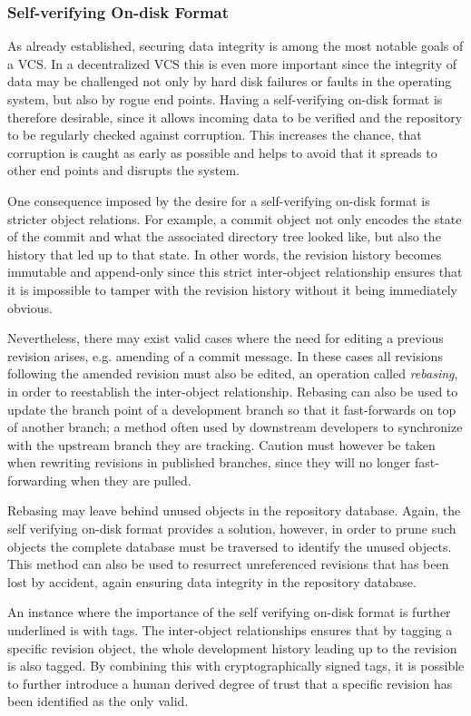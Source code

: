 \subsubsection{Self-verifying On-disk Format}

As already established, securing data integrity is among the most
notable goals of a VCS. In a decentralized VCS this is even more
important since the integrity of data may be challenged not only by
hard disk failures or faults in the operating system, but also by
rogue end points. Having a self-verifying on-disk
format is therefore desirable, since it allows incoming data to be
verified and the repository to be regularly checked against
corruption. This increases the chance, that corruption is caught as
early as possible and helps to avoid that it spreads to other end
points and disrupts the system.

One consequence imposed by the desire for a self-verifying on-disk
format is stricter object relations. For example, a commit object not
only encodes the state of the commit and what the associated directory
tree looked like, but also the history that led up to that state. In
other words, the revision history becomes immutable and append-only
since this strict inter-object relationship ensures that it is
impossible to tamper with the revision history without it being
immediately obvious.

Nevertheless, there may exist valid cases where the need for editing a
previous revision arises, e.g. amending of a commit message. In these
cases all revisions following the amended revision must also be
edited, an operation called \emph{rebasing}, in order to reestablish
the inter-object relationship. Rebasing can also be used to update the
branch point of a development branch so that it fast-forwards on top
of another branch; a method often used by downstream developers to
synchronize with the upstream branch they are tracking. Caution must
however be taken when rewriting revisions in published branches, since
they will no longer fast-forwarding when they are pulled.

Rebasing may leave behind unused objects in the repository database.
Again, the self verifying on-disk format provides a solution,
however, in order to prune such objects the complete database must be
traversed to identify the unused objects. This method can also be used
to resurrect unreferenced revisions that has been lost by accident,
again ensuring data integrity in the repository database.

An instance where the importance of the self verifying on-disk format
is further underlined is with tags. The inter-object relationships
ensures that by tagging a specific revision object, the whole
development history leading up to the revision is also tagged. By
combining this with cryptographically signed tags, it is possible to
further introduce a human derived degree of trust that a
specific revision has been identified as the only valid.

